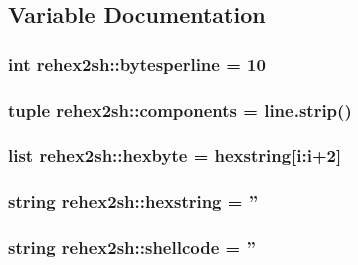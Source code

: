 \subsection{\-Variable \-Documentation}
\hypertarget{namespacerehex2sh_a6871a6d428039f71f95e8fafadae894e}{
\subsubsection[{bytesperline}]{\setlength{\rightskip}{0pt plus 5cm}int {\bf rehex2sh\-::bytesperline} = 10}}
\label{namespacerehex2sh_a6871a6d428039f71f95e8fafadae894e}
\hypertarget{namespacerehex2sh_a46d30aa0b79379b0ae46b60e57e3a36b}{
\subsubsection[{components}]{\setlength{\rightskip}{0pt plus 5cm}tuple {\bf rehex2sh\-::components} = line.\-strip()}}
\label{namespacerehex2sh_a46d30aa0b79379b0ae46b60e57e3a36b}
\hypertarget{namespacerehex2sh_aac23a21b6bd08055ad23d4b30b34367b}{
\subsubsection[{hexbyte}]{\setlength{\rightskip}{0pt plus 5cm}list {\bf rehex2sh\-::hexbyte} = {\bf hexstring}\mbox{[}i\-:i+2\mbox{]}}}
\label{namespacerehex2sh_aac23a21b6bd08055ad23d4b30b34367b}
\hypertarget{namespacerehex2sh_ae94339789f7c777c35511b0d5e15f985}{
\subsubsection[{hexstring}]{\setlength{\rightskip}{0pt plus 5cm}string {\bf rehex2sh\-::hexstring} = ''}}
\label{namespacerehex2sh_ae94339789f7c777c35511b0d5e15f985}
\hypertarget{namespacerehex2sh_adc89af6fa1de3747a0439ec88e8e947f}{
\subsubsection[{shellcode}]{\setlength{\rightskip}{0pt plus 5cm}string {\bf rehex2sh\-::shellcode} = ''}}
\label{namespacerehex2sh_adc89af6fa1de3747a0439ec88e8e947f}
